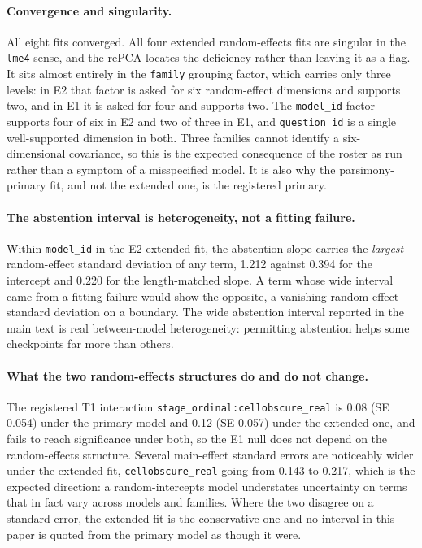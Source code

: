 \paragraph{Convergence and singularity.}
All eight fits converged. All four extended random-effects fits are singular in
the \texttt{lme4} sense, and the rePCA locates the deficiency rather than
leaving it as a flag. It sits almost entirely in the \texttt{family} grouping
factor, which carries only three levels: in E2 that factor is asked for six
random-effect dimensions and supports two, and in E1 it is asked for four and
supports two. The \texttt{model\_id} factor supports four of six in E2 and two
of three in E1, and \texttt{question\_id} is a single well-supported dimension
in both. Three families cannot identify a six-dimensional covariance, so this
is the expected consequence of the roster as run rather than a symptom of a
misspecified model. It is also why the parsimony-primary fit, and not the
extended one, is the registered primary.

\paragraph{The abstention interval is heterogeneity, not a fitting failure.}
Within \texttt{model\_id} in the E2 extended fit, the abstention slope carries
the \emph{largest} random-effect standard deviation of any term, 1.212 against
0.394 for the intercept and 0.220 for the length-matched slope. A term whose
wide interval came from a fitting failure would show the opposite, a vanishing
random-effect standard deviation on a boundary. The wide abstention interval
reported in the main text is real between-model heterogeneity: permitting
abstention helps some checkpoints far more than others.

\paragraph{What the two random-effects structures do and do not change.}
The registered T1 interaction \texttt{stage\_ordinal:cellobscure\_real} is
0.08 (SE 0.054) under the primary model and 0.12 (SE 0.057) under the extended
one, and fails to reach significance under both, so the E1 null does not depend
on the random-effects structure. Several main-effect standard errors are
noticeably wider under the extended fit, \texttt{cellobscure\_real} going from
0.143 to 0.217, which is the expected direction: a random-intercepts model
understates uncertainty on terms that in fact vary across models and families.
Where the two disagree on a standard error, the extended fit is the
conservative one and no interval in this paper is quoted from the primary model
as though it were.

